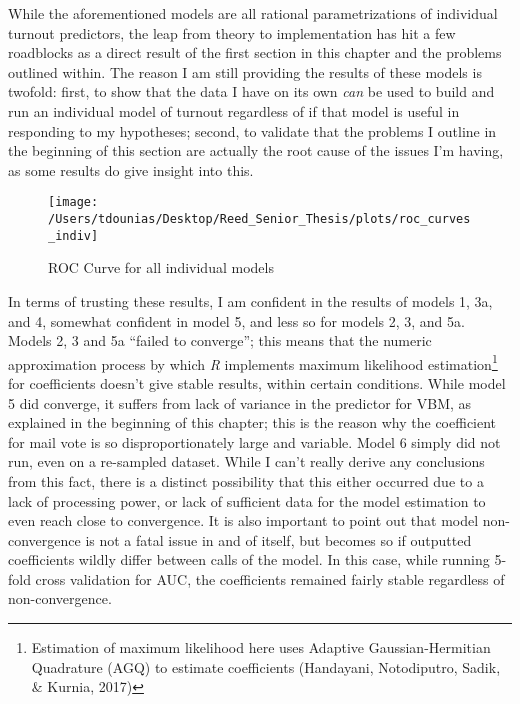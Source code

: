 \documentclass[12pt,twoside]{reedthesis}
\begin{document}
  While the aforementioned models are all rational parametrizations of
  individual turnout predictors, the leap from theory to implementation
  has hit a few roadblocks as a direct result of the first section in this
  chapter and the problems outlined within. The reason I am still
  providing the results of these models is twofold: first, to show that
  the data I have on its own \emph{can} be used to build and run an
  individual model of turnout regardless of if that model is useful in
  responding to my hypotheses; second, to validate that the problems I
  outline in the beginning of this section are actually the root cause of
  the issues I'm having, as some results do give insight into this.
  
  \begin{figure}
  
  {\centering \texttt{[image: /Users/tdounias/Desktop/Reed\_Senior\_Thesis/plots/roc\_curves\_indiv]} 
  
  }
  
  \caption[ROC Curve for all individual models]{ROC Curve for all individual models}\label{fig:roc the curves}
  \end{figure}
  
  In terms of trusting these results, I am confident in the results of
  models 1, 3a, and 4, somewhat confident in model 5, and less so for
  models 2, 3, and 5a. Models 2, 3 and 5a ``failed to converge''; this
  means that the numeric approximation process by which \textit{R}
  implements maximum likelihood estimation\footnote{Estimation of maximum
    likelihood here uses Adaptive Gaussian-Hermitian Quadrature (AGQ) to
    estimate coefficients (Handayani, Notodiputro, Sadik, \& Kurnia, 2017)}
  for coefficients doesn't give stable results, within certain conditions.
  While model 5 did converge, it suffers from lack of variance in the
  predictor for VBM, as explained in the beginning of this chapter; this
  is the reason why the coefficient for mail vote is so disproportionately
  large and variable. Model 6 simply did not run, even on a re-sampled
  dataset. While I can't really derive any conclusions from this fact,
  there is a distinct possibility that this either occurred due to a lack
  of processing power, or lack of sufficient data for the model estimation
  to even reach close to convergence. It is also important to point out
  that model non-convergence is not a fatal issue in and of itself, but
  becomes so if outputted coefficients wildly differ between calls of the
  model. In this case, while running 5-fold cross validation for AUC, the
  coefficients remained fairly stable regardless of non-convergence.
  
\end{document}
